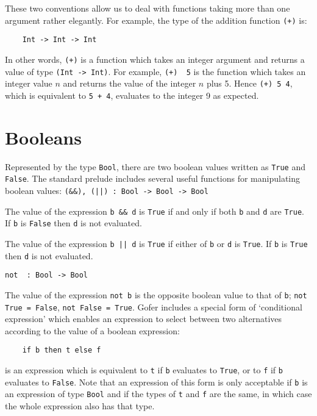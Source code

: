 These two conventions allow us to deal with functions taking more  than
one argument rather elegantly.  For example, the type of  the  addition
function \verb"(+)" is:
\begin{verbatim}
    Int -> Int -> Int
\end{verbatim}
In other words, \verb"(+)" is a function which takes an integer argument and
returns a value of type \verb"(Int -> Int)".  For  example,  
\verb"(+)  5"  is  the
function which takes an integer value $n$ and returns the  value  of  the
integer $n$ plus 5.  Hence \verb"(+) 5 4", which is equivalent  to  
\verb"5 + 4",
evaluates to the integer 9 as expected.


\section{Booleans}
Represented by the type \verb"Bool", there are two boolean values written as
\verb"True" and \verb"False". 
The  standard  prelude  includes  several  useful
functions for manipulating boolean values:
\BI
\IT    \verb"(&&), (||) : Bool -> Bool -> Bool"

        The value of the expression \verb"b && d" is \verb"True"
        if and only if  both
        \verb"b" and \verb"d" are \verb"True".
        If \verb"b" is \verb"False" then \verb"d" is not evaluated.

        The value of the expression \verb"b || d" is \verb"True"
        if either of \verb"b" or  \verb"d"
        is \verb"True".  If \verb"b" is \verb"True" then \verb"d"
        is not evaluated.

\IT    \verb"not  : Bool -> Bool"

        The value of the expression \verb"not b" is the opposite boolean value
        to that of \verb"b"; \verb"not True = False", \verb"not False = True".
\EI
Gofer includes a special form of `conditional expression' which enables
an expression to select between two alternatives according to the value
of a boolean expression:
\begin{verbatim}
    if b then t else f 
\end{verbatim}
is an expression which is equivalent to \verb"t" if \verb"b"
evaluates to \verb"True", or to
\verb"f" if \verb"b" evaluates to \verb"False".
Note that an expression  of  this  form  is
only acceptable if \verb"b" is an expression of type \verb"Bool"
and if the types  of
\verb"t" and \verb"f" are the same, 
in which case the whole expression also has  that
type.



